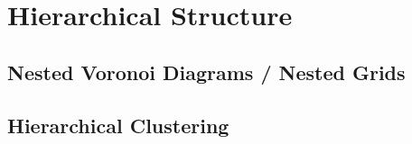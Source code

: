 \section{Hierarchical Structure}
\label{sec:synthetic:hierarchical_structure}

\subsection{Nested Voronoi Diagrams / Nested Grids}
\label{sec:synthetic:nested_voronoi}

\subsection{Hierarchical Clustering}
\label{sec:synthetic:hierarchical_clustering}

